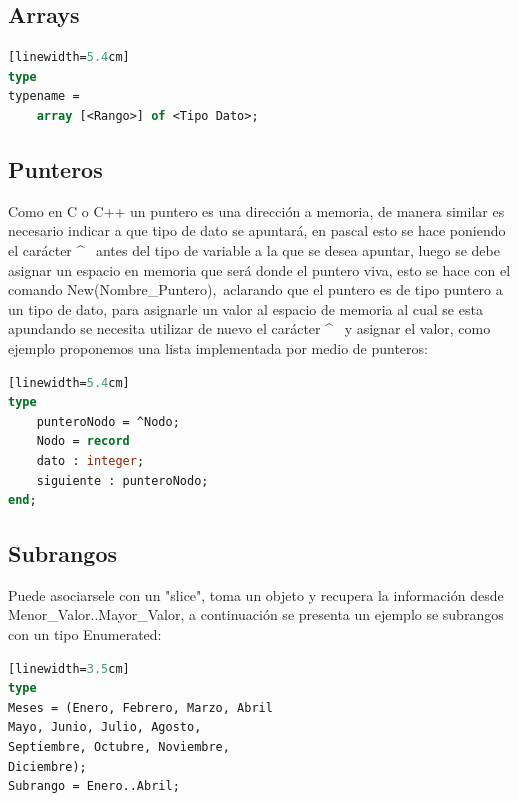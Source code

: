 \documentclass[10pt,journal,compsoc]{IEEEtran}
\begin{document}
\subsection{Arrays}
\begin{lstlisting}[language=Pascal, caption = {C\'odigo de declaraci\'on para un array}][linewidth=5.4cm]
type
typename = 
	array [<Rango>] of <Tipo Dato>;
\end{lstlisting}

\subsection{Punteros}
Como en C o C++ un puntero es una direcci\'on a memoria, de manera similar es necesario indicar a que tipo de dato se apuntar\'a, en pascal esto se hace poniendo el car\'acter \large \textasciicircum~ \normalsize antes del tipo de variable a la que se desea apuntar, luego se debe asignar un espacio en memoria que ser\'a donde el puntero viva, esto se hace con el comando New(Nombre\_Puntero),~aclarando que el puntero es de tipo puntero a un tipo de dato, para asignarle un valor al espacio de memoria al cual se esta apundando se necesita utilizar de nuevo el car\'acter \large \textasciicircum~ \normalsize y asignar el valor, como ejemplo proponemos una lista implementada por medio de punteros:
\begin{lstlisting}[language=Pascal, caption = {C\'odigo de una lista con punteros}][linewidth=5.4cm]
type
	punteroNodo = ^Nodo;	
	Nodo = record
	dato : integer;
	siguiente : punteroNodo;
end;
\end{lstlisting}

\subsection{Subrangos}
Puede asociarsele con un "slice", toma un objeto y recupera la informaci\'on desde Menor\_Valor..Mayor\_Valor, a continuaci\'on se presenta un ejemplo se subrangos con un tipo Enumerated:
\begin{lstlisting}[language=Pascal, caption = {Ejemplo de subrangos}][linewidth=3.5cm]
type
Meses = (Enero, Febrero, Marzo, Abril
Mayo, Junio, Julio, Agosto,
Septiembre, Octubre, Noviembre,
Diciembre);
Subrango = Enero..Abril;
\end{lstlisting}
\end{document}
